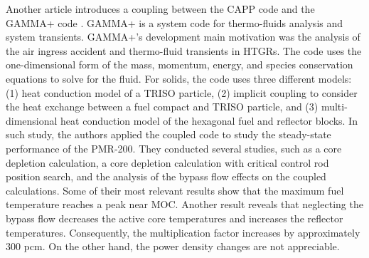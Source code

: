 \documentclass[11pt,letterpaper]{article}
\begin{document}
Another article \cite{tak_cappgamma_2016} introduces a coupling between the CAPP code and the GAMMA+ code \cite{lim_gamma_2006}.
GAMMA+ is a system code for thermo-fluids analysis and system transients.
GAMMA+'s development main motivation was the analysis of the air ingress accident and thermo-fluid transients in \glspl{HTGR}.
The code uses the one-dimensional form of the mass, momentum, energy, and species conservation equations to solve for the fluid.
For solids, the code uses three different models: (1) heat conduction model of a TRISO particle, (2) implicit coupling to consider the heat exchange between a fuel compact and TRISO particle, and (3) multi-dimensional heat conduction model of the hexagonal fuel and reflector blocks.
In such study, the authors applied the coupled code to study the steady-state performance of the PMR-200.
They conducted several studies, such as a core depletion calculation, a core depletion calculation with critical control rod position search, and the analysis of the bypass flow effects on the coupled calculations.
Some of their most relevant results show that the maximum fuel temperature reaches a peak near MOC.
Another result reveals that neglecting the bypass flow decreases the active core temperatures and increases the reflector temperatures.
Consequently, the multiplication factor increases by approximately 300 pcm.
On the other hand, the power density changes are not appreciable.
\end{document}
